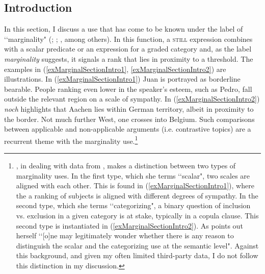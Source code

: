 \subsection[tocentry={}]{Introduction}
In this section, I discuss a use that has come to be known under the label of \lq\lq marginality" (\cite{Ippolito2007}; \cite{Koenig1977}; \cite{Michaelis1993}, among others). In this function, a \textsc{still} expression combines with a scalar predicate or an expression for a graded category and, as the label \textit{marginality} suggests, it signals a rank that lies in proximity to a threshold. The examples in  (\ref{exMarginalSectionIntro1}, \ref{exMarginalSectionIntro2}) are illustrations. In (\ref{exMarginalSectionIntro1}) Juan is portrayed as borderline bearable. People ranking even lower in the speaker's esteem, such as Pedro, fall outside the relevant region on a scale of sympathy. In (\ref{exMarginalSectionIntro2}) \textit{noch} highlights that Aachen lies within German territory, albeit in proximity to the border. Not much further West, one crosses into Belgium. Such comparisons between applicable and non-applicable arguments (i.e. contrastive topics) are a recurrent theme with the marginality use.\footnote{\textcite[ch. 7.2]{MosegaardHansen2008}, in dealing with data from , makes a distinction between two types of marginality uses. In the first type, which she terms \lq\lq scalar", two scales are aligned with each other. This is found in (\ref{exMarginalSectionIntro1}), where the a ranking of subjects is aligned with different degrees of sympathy. In the second type, which she terms \lq\lq categorizing", a binary question of inclusion vs. exclusion in a given category is at stake, typically in a copula clause. This second type is instantiated in (\ref{exMarginalSectionIntro2}). As \textcite[181]{MosegaardHansen2008} points out herself \lq\lq [o]ne may legitimately wonder whether there is any reason to distinguish the scalar and the categorizing use at the semantic level". Against this background, and given my often limited third-party data, I do not follow this distinction in my discussion.}


